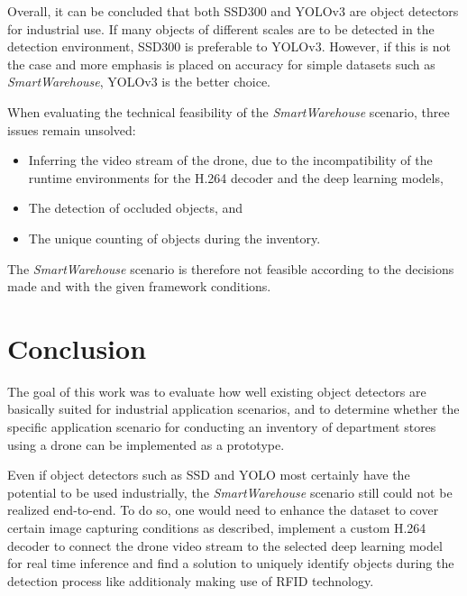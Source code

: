 \documentclass[a4paper, 10pt, journal]{wissarbIEEE}      %
\begin{document}
Overall, it can be concluded that both SSD300 and YOLOv3 are object detectors for industrial use. If many objects of different scales are to be detected in the detection environment, SSD300 is preferable to YOLOv3. However, if this is not the case and more emphasis is placed on accuracy for simple datasets such as \textit{SmartWarehouse}, YOLOv3 is the better choice.

When evaluating the technical feasibility of the \textit{SmartWarehouse} scenario, three issues remain unsolved:

\begin{itemize}
	\item Inferring the video stream of the drone, due to the incompatibility of the runtime environments for the H.264 decoder and the deep learning models,
	\item The detection of occluded objects, and
	\item The unique counting of objects during the inventory.
\end{itemize}

The \textit{SmartWarehouse} scenario is therefore not feasible according to the decisions made and with the given framework conditions.

\section{Conclusion} \label{conclusion}

The goal of this work was to evaluate how well existing object detectors are basically suited for industrial application scenarios, and to determine whether the specific application scenario for conducting an inventory of department stores using a drone can be implemented as a prototype. 

Even if object detectors such as SSD and YOLO most certainly have the potential to be used industrially, the \textit{SmartWarehouse} scenario still could not be realized end-to-end. To do so, one would need to enhance the dataset to cover certain image capturing conditions as described, implement a custom H.264 decoder to connect the drone video stream to the selected deep learning model for real time inference and find a solution to uniquely identify objects during the detection process like additionaly making use of RFID technology. 


\end{document}
